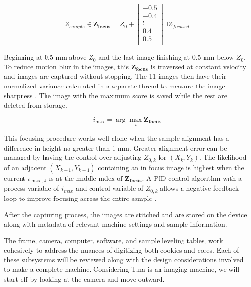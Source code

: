 \documentclass[a4paper,12pt]{article}
\begin{document}
\[
Z_{sample} \in
\boldsymbol{Z_{\text{focus}}} = 
Z_0 + 
\begin{bmatrix}
-0.5 \\
-0.4 \\
\vdots \\
0.4 \\
0.5 \\
\end{bmatrix}
\exists 
Z_{focused}
\] %

Beginning at 0.5 mm above $Z_0$ and the last image finishing at 0.5 mm below $Z_0$.
To reduce motion blur in the images, this $\boldsymbol{Z_{\text{focus}}}$ is traversed at constant velocity and images are captured without stopping. 
The 11 images then have their normalized variance calculated in a separate thread to measure the image sharpness \citep{sampat_extensive_2014}.
The image with the maximum score is saved while the rest are deleted from storage.


\[
    i_{\max} = \arg\max_{i} \boldsymbol{Z_{\text{focus}}}
\]
    
This focusing procedure works well alone when the sample alignment has a difference in height no greater than 1 mm. 
Greater alignment error can be managed by having the control over adjusting $Z_{0,k}$ for $(X_k,Y_k)$.
The likelihood of an adjacent $(X_{k+1}, Y_{k+1})$ containing an in focus image is highest when the current $i_{{\max,k}}$ is at the middle index of $\boldsymbol{Z_{focus}}$. 
A PID control algorithm with a process variable of $i_{max}$ and control variable of $Z_{0,k}$ allows a negative feedback loop to improve focusing across the entire sample \citep{odwyer_summary_2000}. 

After the capturing process, the images are stitched and are stored on the device along with metadata of relevant machine
settings and sample information. 

The frame, camera, computer, software, and sample leveling tables, work cohesively to address the nuances of digitizing both cookies and cores. 
Each of these subsystems will be reviewed along with the design considerations involved to make a complete machine. 
Considering Tina is an imaging machine, we will start off by looking at the camera and move outward.
\end{document}

